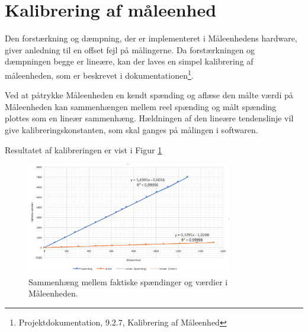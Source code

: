 
\section{Kalibrering af måleenhed}

Den forstærkning og dæmpning, der er implementeret i Måleenhedens hardware, giver anledning til en offset fejl på målingerne. Da forstærkningen og dæmpningen begge er lineære, kan der laves en simpel kalibrering af måleenheden, som er beskrevet i dokumentationen\footnote{Projektdokumentation, 9.2.7, Kalibrering af Måleenhed}.\newline

Ved at påtrykke Måleenheden en kendt spænding og aflæse den målte værdi på Måleenheden kan sammenhængen mellem reel spænding og målt spænding plottes som en lineær sammenhæng. Hældningen af den lineære tendenslinje vil give kalibreringskonstanten, som skal ganges på målingen i softwaren. 

Resultatet af kalibreringen er vist i Figur \ref{fig:MEgraf}

\begin{figure}[H]
	\centering
	\includegraphics[width=0.80\textwidth]{figure/MEkalibreringgraf}
	\caption{Sammenhæng mellem faktiske spændinger og værdier i Måleenheden.}
	\label{fig:MEgraf}
\end{figure}